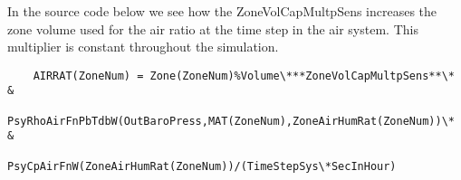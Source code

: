 In the source code below we see how the ZoneVolCapMultpSens increases the zone volume used for the air ratio at the time step in the air system. This multiplier is constant throughout the simulation.

\begin{lstlisting}
    AIRRAT(ZoneNum) = Zone(ZoneNum)%Volume\***ZoneVolCapMultpSens**\* &
               PsyRhoAirFnPbTdbW(OutBaroPress,MAT(ZoneNum),ZoneAirHumRat(ZoneNum))\* &
               PsyCpAirFnW(ZoneAirHumRat(ZoneNum))/(TimeStepSys\*SecInHour)
\end{lstlisting}

